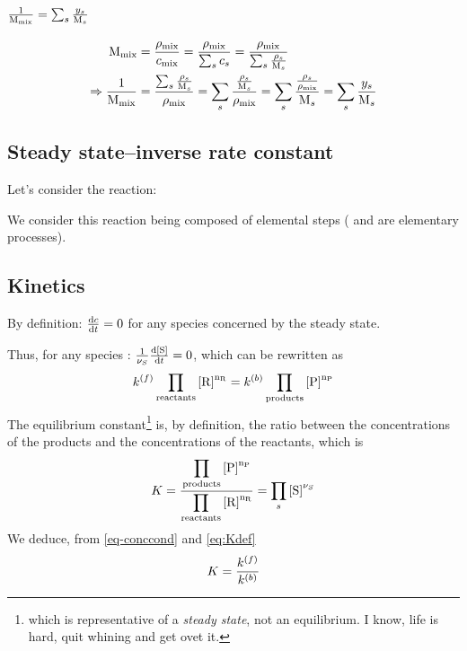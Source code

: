 \section{\texorpdfstring{$\frac{1}{\Mm[\text{mix}]} = \sum_s \frac{\massfrac[s]}{\Mm[s]}$}{Mixture molar mass}}
\label{demo-Mm}
\[
\begin{split}
\Mm[\text{mix}] & = \frac{\mass[\text{mix}]}{\conc_\text{mix}}
                  = \frac{\mass[\text{mix}]}{\sum_s \conc_s}
                  = \frac{\mass[\text{mix}]}{\sum_s \frac{\mass[s]}{\Mm[s]}}\\
\Rightarrow
\frac{1}{\Mm[\text{mix}]}
               & = \frac{\sum_s\frac{\mass[s]}{\Mm[s]}}{\mass[\text{mix}]}
                 = \sum_s\frac{\frac{\mass[s]}{\Mm[s]}}{\mass[\text{mix}]}
                 = \sum_s\frac{\frac{\mass[s]}{\mass[\text{mix}]}}{\Mm[s]}
                 = \sum_s\frac{\massfrac[s]}{\Mm[s]}
\end{split}
\]

\subsection{Steady state--inverse rate constant}

Let's consider the reaction:
\begin{chemicalEquation}
\label{eq:equat}
\end{chemicalEquation}


We consider this reaction being composed of elemental steps
( and
are elementary processes). 

\subsection{Kinetics}
\label{demo-eq_kin}

By definition: $\frac{\dd \conc}{\dd t} = 0$ for any species concerned by the steady state.

Thus, for any species : 
$\frac{1}{\scoef[S]}\frac{\dd\conc[S]}{\dd t} =  0$, which can be rewritten as
\begin{equation}
\fwdratecons \prodReac = \bkwdratecons \prodProd
\label{eq-conccond}
\end{equation}
The equilibrium constant\footnote{which is representative of a \emph{steady state}, not
an equilibrium. I know, life is hard, quit whining and get ovet it.} is, by definition, the
ratio between the concentrations of the products and the concentrations of the reactants,
which is
\begin{equation}
\Eqconst 
         = \frac{\displaystyle\prodProd}
                {\displaystyle\prodReac}
         = \prod_{s}\conc[S]^{\scoef[S]} 
\label{eq:Kdef}
\end{equation}
We deduce, from \ref{eq-conccond} and \ref{eq:Kdef}
\begin{equation}
\Eqconst = \frac{\fwdratecons}{\bkwdratecons}
\end{equation}

